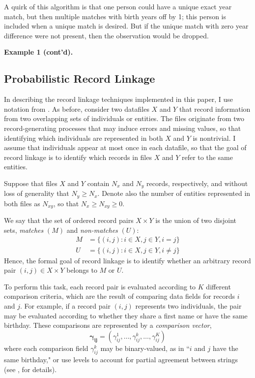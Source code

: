 \documentclass[12pt]{article}
\begin{document}
A quirk of this algorithm is that one person could have a unique exact year match, but then multiple matches with birth years off by 1; this person is included when a unique match is desired.  But if the unique match with zero year difference were not present, then the observation would be dropped. 

\textbf{Example 1 (cont'd).}

\subsection{Probabilistic Record Linkage}
In describing the record linkage techniques implemented in this paper, I use notation from \cite{fellegi69}.  As before, consider two datafiles $X$ and $Y$ that record information from two overlapping sets of individuals or entities.  The files originate from two record-generating processes that may induce errors and missing values, so that identifying which individuals are represented in both $X$ and $Y$ is nontrivial.  I assume that individuals appear at most once in each datafile, so that the goal of record linkage is to identify which records in files $X$ and $Y$ refer to the same entities.

Suppose that files $X$ and $Y$ contain $N_x$ and $N_y$ records, respectively, and without loss of generality that $N_y \geq N_x$.  Denote also the number of entities represented in both files as $N_{xy}$, so that $N_x \geq N_{xy} \geq 0$. 

We say that the set of ordered record pairs $X \times Y$ is the union of two disjoint sets, \textit{matches} $(M)$ and \textit{non-matches} $(U)$:
\begin{align*} M &= \{(i,j): i\in X, j\in Y, i=j\} \\ U &= \{(i,j): i\in X, j\in Y, i\neq j\}\end{align*} 
Hence, the formal goal of record linkage is to identify whether an arbitrary record pair $(i,j)\in X\times Y$ belongs to $M$ or $U$.  

To perform this task, each record pair is evaluated according to $K$ different comparison criteria, which are the result of comparing data fields for records $i$ and $j$.  For example, if a record pair $(i,j)$ represents two individuals, the pair may be evaluated according to whether they share a first name or have the same birthday.  These comparisons are represented by a \textit{comparison vector}, $$\mathbf{\gamma_{ij}}= (\gamma_{ij}^1, \dots, \gamma_{ij}^{k}, \dots, \gamma_{ij}^K)$$  where each comparison field $\gamma_{ij}^{k}$ may be binary-valued, as in ``$i$ and $j$ have the same birthday," or use levels to account for partial agreement between strings (see \citealp{winkler90}, for details).  
\end{document}
